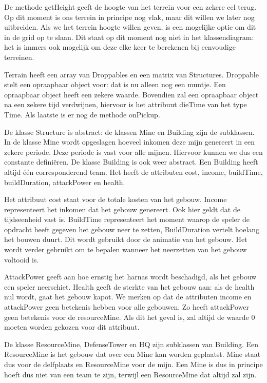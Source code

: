 De methode getHeight geeft de hoogte van het terrein voor een zekere cel terug. Op dit moment is ons terrein in principe nog vlak, maar dit willen we later nog uitbreiden. Als we het terrein hoogte willen geven, is een mogelijke optie om dit in de grid op te slaan. Dit staat op dit moment nog niet in het klassendiagram: het is immers ook mogelijk om deze elke keer te berekenen bij eenvoudige terreinen.

Terrain heeft een array van Droppables en een matrix van Structures. Droppable stelt een opraapbaar object voor: dat is nu alleen nog een muntje. Een opraapbaar object heeft een zekere waarde. Bovendien zal een opraapbaar object na een zekere tijd verdwijnen, hiervoor is het attribuut dieTime van het type Time. Als laatste is er nog de methode onPickup.

De klasse Structure is abstract: de klassen Mine en Building zijn de subklassen. In de klasse Mine wordt opgeslagen hoeveel inkomen deze mijn genereert in een zekere periode. Deze periode is vast voor alle mijnen. Hiervoor kunnen we dus een constante defini\"eren. De klasse Building is ook weer abstract. Een Building heeft altijd \'e\'en corresponderend team. Het heeft de attributen cost, income, buildTime, buildDuration, attackPower en health.

Het attribuut cost staat voor de totale kosten van het gebouw. Income representeert het inkomen dat het gebouw genereert. Ook hier geldt dat de tijdseenheid vast is. BuildTime representeert het moment waarop de speler de opdracht heeft gegeven het gebouw neer te zetten, BuildDuration vertelt hoelang het bouwen duurt. Dit wordt gebruikt door de animatie van het gebouw. Het wordt verder gebruikt om te bepalen wanneer het neerzetten van het gebouw voltooid is. 

AttackPower geeft aan hoe ernstig het harnas wordt beschadigd, als het gebouw een speler neerschiet. Health geeft de sterkte van het gebouw aan: als de health nul wordt, gaat het gebouw kapot. We merken op dat de attributen income en attackPower geen betekenis hebben voor alle gebouwen. Zo heeft attackPower geen betekenis voor de resourceMine. Als dit het geval is, zal altijd de waarde 0 moeten worden gekozen voor dit attribuut.

De klasse ResourceMine, DefenseTower en HQ zijn subklassen van Building. Een ResourceMine is het gebouw dat over een Mine kan worden geplaatst. Mine staat dus voor de delfplaats en ResourceMine voor de mijn. Een Mine is dus in principe hoeft dus niet van een team te zijn, terwijl een ResourceMine dat altijd zal zijn.

